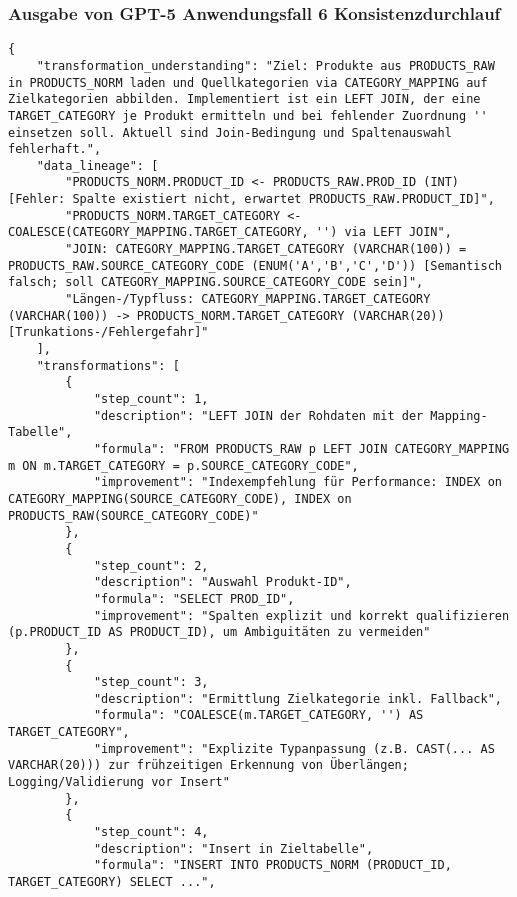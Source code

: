 \subsubsection{Ausgabe von GPT-5 Anwendungsfall 6 Konsistenzdurchlauf}\label{anhang:subsubsec:gpt_case6_prompt2}
\begin{lstlisting}[caption={Ausgabe: GPT-5 Anwendungsfall 6 Konsistenzdurchlauf},label={gpt_case6_prompt2}]
{
    "transformation_understanding": "Ziel: Produkte aus PRODUCTS_RAW in PRODUCTS_NORM laden und Quellkategorien via CATEGORY_MAPPING auf Zielkategorien abbilden. Implementiert ist ein LEFT JOIN, der eine TARGET_CATEGORY je Produkt ermitteln und bei fehlender Zuordnung '' einsetzen soll. Aktuell sind Join-Bedingung und Spaltenauswahl fehlerhaft.",
    "data_lineage": [
        "PRODUCTS_NORM.PRODUCT_ID <- PRODUCTS_RAW.PROD_ID (INT) [Fehler: Spalte existiert nicht, erwartet PRODUCTS_RAW.PRODUCT_ID]",
        "PRODUCTS_NORM.TARGET_CATEGORY <- COALESCE(CATEGORY_MAPPING.TARGET_CATEGORY, '') via LEFT JOIN",
        "JOIN: CATEGORY_MAPPING.TARGET_CATEGORY (VARCHAR(100)) = PRODUCTS_RAW.SOURCE_CATEGORY_CODE (ENUM('A','B','C','D')) [Semantisch falsch; soll CATEGORY_MAPPING.SOURCE_CATEGORY_CODE sein]",
        "Längen-/Typfluss: CATEGORY_MAPPING.TARGET_CATEGORY (VARCHAR(100)) -> PRODUCTS_NORM.TARGET_CATEGORY (VARCHAR(20)) [Trunkations-/Fehlergefahr]"
    ],
    "transformations": [
        {
            "step_count": 1,
            "description": "LEFT JOIN der Rohdaten mit der Mapping-Tabelle",
            "formula": "FROM PRODUCTS_RAW p LEFT JOIN CATEGORY_MAPPING m ON m.TARGET_CATEGORY = p.SOURCE_CATEGORY_CODE",
            "improvement": "Indexempfehlung für Performance: INDEX on CATEGORY_MAPPING(SOURCE_CATEGORY_CODE), INDEX on PRODUCTS_RAW(SOURCE_CATEGORY_CODE)"
        },
        {
            "step_count": 2,
            "description": "Auswahl Produkt-ID",
            "formula": "SELECT PROD_ID",
            "improvement": "Spalten explizit und korrekt qualifizieren (p.PRODUCT_ID AS PRODUCT_ID), um Ambiguitäten zu vermeiden"
        },
        {
            "step_count": 3,
            "description": "Ermittlung Zielkategorie inkl. Fallback",
            "formula": "COALESCE(m.TARGET_CATEGORY, '') AS TARGET_CATEGORY",
            "improvement": "Explizite Typanpassung (z.B. CAST(... AS VARCHAR(20))) zur frühzeitigen Erkennung von Überlängen; Logging/Validierung vor Insert"
        },
        {
            "step_count": 4,
            "description": "Insert in Zieltabelle",
            "formula": "INSERT INTO PRODUCTS_NORM (PRODUCT_ID, TARGET_CATEGORY) SELECT ...",

\end{lstlisting}
